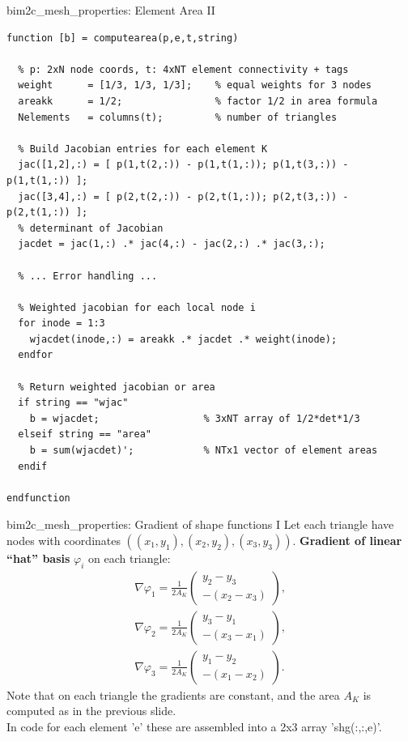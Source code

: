 \documentclass[aspectratio=54,xcolor=dvipsnames]{beamer}
\begin{document}
\begin{frame}[fragile]{bim2c\_mesh\_properties: Element Area II}
\scriptsize
\begin{lstlisting}[firstnumber=374]
function [b] = computearea(p,e,t,string)

  % p: 2xN node coords, t: 4xNT element connectivity + tags
  weight      = [1/3, 1/3, 1/3];    % equal weights for 3 nodes
  areakk      = 1/2;                % factor 1/2 in area formula
  Nelements   = columns(t);         % number of triangles
  
  % Build Jacobian entries for each element K
  jac([1,2],:) = [ p(1,t(2,:)) - p(1,t(1,:)); p(1,t(3,:)) - p(1,t(1,:)) ];
  jac([3,4],:) = [ p(2,t(2,:)) - p(2,t(1,:)); p(2,t(3,:)) - p(2,t(1,:)) ];
  % determinant of Jacobian
  jacdet = jac(1,:) .* jac(4,:) - jac(2,:) .* jac(3,:);   
  
  % ... Error handling ...
  
  % Weighted jacobian for each local node i
  for inode = 1:3
    wjacdet(inode,:) = areakk .* jacdet .* weight(inode);
  endfor
  
  % Return weighted jacobian or area
  if string == "wjac"
    b = wjacdet;                  % 3xNT array of 1/2*det*1/3
  elseif string == "area"
    b = sum(wjacdet)';            % NTx1 vector of element areas
  endif

endfunction
\end{lstlisting}
\end{frame}

\begin{frame}{bim2c\_mesh\_properties: Gradient of shape functions I}
\small
Let each triangle have nodes with coordinates $((x_1,y_1), (x_2,y_2), (x_3,y_3))$.
\textbf{Gradient of linear “hat” basis} \(\varphi_i\) on each triangle:
\begin{align*}
    \nabla\varphi_1 = \frac{1}{2A_K}
        \begin{pmatrix} y_2 - y_3 \\[3pt] -(x_2 - x_3) \end{pmatrix},
    \\
    \nabla\varphi_2 = \frac{1}{2A_K}
        \begin{pmatrix} y_3 - y_1 \\[3pt] -(x_3 - x_1) \end{pmatrix},
    \\
    \nabla\varphi_3 = \frac{1}{2A_K}
        \begin{pmatrix} y_1 - y_2 \\[3pt] -(x_1 - x_2) \end{pmatrix}.
\end{align*}
Note that on each triangle the gradients are constant, and the area $A_K$ is computed as in the previous slide. \\
In code for each element 'e' these are assembled into a 2x3 array 'shg(:,:,e)'.
\end{frame}
\end{document}
